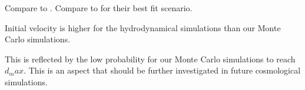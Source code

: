 Compare to \citet{L13}.
Compare to \citet{Donnert13} for their best fit scenario.


Initial velocity is higher for the hydrodynamical simulations than our
Monte Carlo simulations.

This is reflected by the low probability for our Monte Carlo simulations
to reach $d_max$. This is an aspect that should be further investigated in
future cosmological simulations.
 








%
